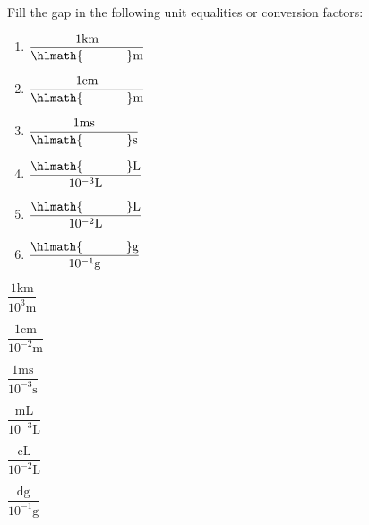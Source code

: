 \documentclass[main.tex]{subfiles}
\begin{document}
\begin{multicols*}{2}
\begin{question}[ID=\the\value{numA}]
Fill the gap in the following unit equalities or conversion factors:
\begin{multicols}{2} 
  \noindent\begin{enumerate} [topsep=0pt, partopsep=1pt, label=(\alph*), leftmargin=1cm]
\item $\dfrac{1\text{km}}{\hlmath{\hspace{35pt }} \text{m}}$
   \item$\dfrac{1\text{cm}}{\hlmath{\hspace{35pt }} \text{m}}$
  \item $\dfrac{1\text{ms}}{\hlmath{\hspace{35pt }} \text{s}}$
  \item $\dfrac{\hlmath{\hspace{35pt }} \text{L}}{ 10^{-3}\text{L}}$
 \item  $\dfrac{\hlmath{\hspace{35pt }} \text{L}}{ 10^{-2}\text{L}}$
  \item   $\dfrac{\hlmath{\hspace{35pt }} \text{g}}{ 10^{-1}\text{g}}$
  \end{enumerate}
 \end{multicols}
\end{question}
\begin{solution}
\begin{inparaenum}[(a)]
\item $\dfrac{1\text{km}}{ 10^{3}     \text{m}}$
   \item$\dfrac{1\text{cm}}{ 10^{-2}   \text{m}}$
  \item $\dfrac{1\text{ms}}{  10^{-3} \text{s}}$
  \item $\dfrac{   \text{mL}}{ 10^{-3}\text{L}}$
 \item  $\dfrac{   \text{cL}}{ 10^{-2}\text{L}}$
  \item   $\dfrac{   \text{dg}}{ 10^{-1}\text{g}}$
\end{inparaenum}
\hspace{0.1cm}\end{solution}%












\end{multicols*}
\end{document}
